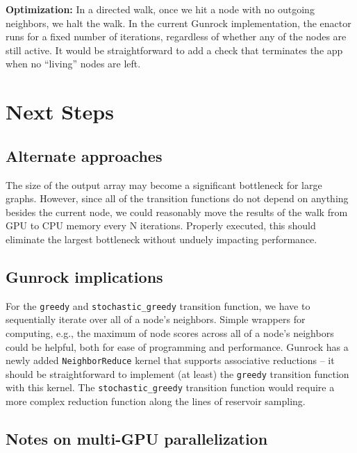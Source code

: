 \documentclass[10pt,oneside]{memoir}
\begin{document}
\textbf{Optimization:} In a directed walk, once we hit a node with no
outgoing neighbors, we halt the walk. In the current Gunrock
implementation, the enactor runs for a fixed number of iterations,
regardless of whether any of the nodes are still active. It would be
straightforward to add a check that terminates the app when no
``living'' nodes are left.

\hypertarget{next-steps-3}{%
\section{Next Steps}\label{next-steps-3}}

\hypertarget{alternate-approaches-2}{%
\subsection{Alternate approaches}\label{alternate-approaches-2}}

The size of the output array may become a significant bottleneck for
large graphs. However, since all of the transition functions do not
depend on anything besides the current node, we could reasonably move
the results of the walk from GPU to CPU memory every N iterations.
Properly executed, this should eliminate the largest bottleneck without
unduely impacting performance.

\hypertarget{gunrock-implications-2}{%
\subsection{Gunrock implications}\label{gunrock-implications-2}}

For the \texttt{greedy} and \texttt{stochastic\_greedy} transition
function, we have to sequentially iterate over all of a node's
neighbors. Simple wrappers for computing, e.g., the maximum of node
scores across all of a node's neighbors could be helpful, both for ease
of programming and performance. Gunrock has a newly added
\texttt{NeighborReduce} kernel that supports associative reductions --
it should be straightforward to implement (at least) the \texttt{greedy}
transition function with this kernel. The \texttt{stochastic\_greedy}
transition function would require a more complex reduction function
along the lines of reservoir sampling.

\hypertarget{notes-on-multi-gpu-parallelization-3}{%
\subsection{Notes on multi-GPU
parallelization}\label{notes-on-multi-gpu-parallelization-3}}
\end{document}
